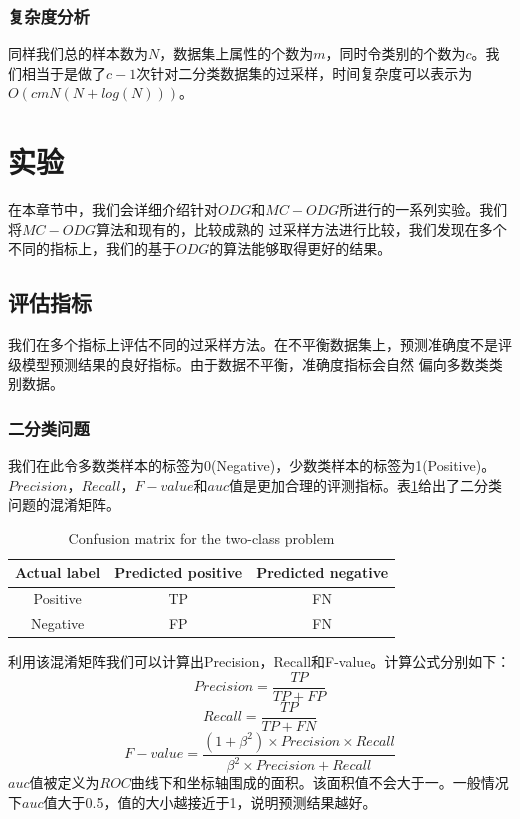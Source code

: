 \documentclass{article}
\begin{document}
\subsubsection{复杂度分析}
同样我们总的样本数为$N$，数据集上属性的个数为$m$，同时令类别的个数为$c$。我们相当于是做了$c-1$次针对二分类数据集的过采样，时间复杂度可以表示为
$O(cmN(N+log(N)))$。

\section{实验}
在本章节中，我们会详细介绍针对$ODG$和$MC-ODG$所进行的一系列实验。我们将$MC-ODG$算法和现有的，比较成熟的
过采样方法进行比较，我们发现在多个不同的指标上，我们的基于$ODG$的算法能够取得更好的结果。

\subsection{评估指标}
我们在多个指标上评估不同的过采样方法。在不平衡数据集上，预测准确度不是评级模型预测结果的良好指标。由于数据不平衡，准确度指标会自然
偏向多数类类别数据。
\subsubsection{二分类问题}
我们在此令多数类样本的标签为0(Negative)，少数类样本的标签为1(Positive)。
$Precision$，$Recall$，$F-value$和$auc$值是更加合理的评测指标。表\ref{table1}给出了二分类问题的混淆矩阵。
\begin{table}[]
  \caption{Confusion matrix for the two-class problem}
  \label{table1}
  \begin{tabular}{@{}ccc@{}}
  \toprule
  Actual label & \multicolumn{1}{l}{Predicted positive} & \multicolumn{1}{l}{Predicted negative} \\ \midrule
  Positive     & TP                                     & FN                                     \\
  Negative     & FP                                     & FN                                     \\ \bottomrule
  \end{tabular}
  \end{table}
利用该混淆矩阵我们可以计算出Precision，Recall和F-value。计算公式分别如下：
\begin{equation}
  Precision=\frac{TP}{TP+FP}
\end{equation}
\begin{equation}
  Recall=\frac{TP}{TP+FN}
\end{equation}
\begin{equation}
  F-value=\frac{(1+\beta^2) \times Precision \times Recall}{\beta^2 \times Precision+Recall}
\end{equation}
$auc$值被定义为$ROC$曲线下和坐标轴围成的面积。该面积值不会大于一。一般情况下$auc$值大于0.5，值的大小越接近于1，说明预测结果越好。
\end{document}
